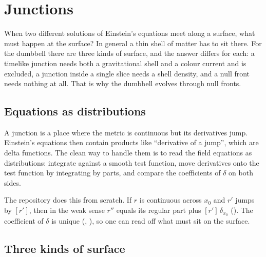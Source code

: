 \chapter{Junctions}\label{ch:junctions}

\begin{questionbox}
When two different solutions of Einstein's equations meet along a surface, what must happen at the surface? In general a thin shell of matter has to sit there. For the dumbbell there are three kinds of surface, and the answer differs for each: a timelike junction needs both a gravitational shell and a colour current and is excluded, a junction inside a single slice needs a shell density, and a null front needs nothing at all. That is why the dumbbell evolves through null fronts.
\end{questionbox}

\section{Equations as distributions}

A junction is a place where the metric is continuous but its derivatives jump. Einstein's equations then contain products like ``derivative of a jump'', which are delta functions. The clean way to handle them is to read the field equations as distributions: integrate against a smooth test function, move derivatives onto the test function by integrating by parts, and compare the coefficients of $\delta$ on both sides.

The repository does this from scratch. If $r$ is continuous across $x_0$ and $r'$ jumps by $[r']$, then in the weak sense $r''$ equals its regular part plus $[r']\,\delta_{x_0}$ (). The coefficient of $\delta$ is unique (, ), so one can read off what must sit on the surface.

\section{Three kinds of surface}

